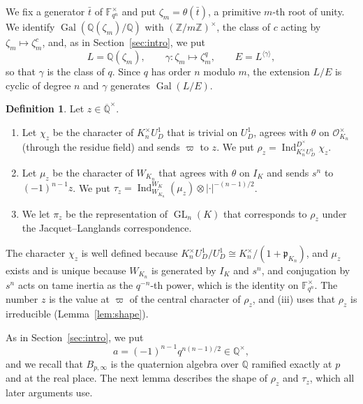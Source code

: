 \documentclass[a4paper,11pt]{amsart}
\theoremstyle{definition}
\newtheorem{definition}[theorem]{Definition}
\theoremstyle{remark}
\numberwithin{equation}{section}
\newcommand{\Q}{\mathbb{Q}}
\newcommand{\Z}{\mathbb{Z}}
\DeclareMathOperator{\Gal}{Gal}
\DeclareMathOperator{\GL}{GL}
\newcommand{\F}{\mathbb{F}}
\newcommand{\Qbar}{\overline{\mathbb{Q}}}
\newcommand{\OO}{\mathcal{O}}
\DeclareMathOperator{\Ind}{Ind}
\begin{document}
We fix a generator $\bar t$ of $\F_{q^n}^\times$ and put $\zeta_m=\theta(\bar t)$, a primitive $m$-th root of unity. We identify $\Gal(\Q(\zeta_m)/\Q)$ with $(\Z/m\Z)^\times$, the class of $c$ acting by $\zeta_m\mapsto\zeta_m^c$, and, as in Section~\ref{sec:intro}, we put
\[
 L=\Q(\zeta_m),\qquad \gamma\colon\zeta_m\mapsto\zeta_m^q,\qquad E=L^{\langle\gamma\rangle},
\]
so that $\gamma$ is the class of $q$. Since $q$ has order $n$ modulo $m$, the extension $L/E$ is cyclic of degree $n$ and $\gamma$ generates $\Gal(L/E)$.

\begin{definition}\label{def:depth-zero-reps}
Let $z\in\Qbar^\times$.
\begin{enumerate}
\item[(i)] Let $\chi_z$ be the character of $K_n^\times U_D^1$ that is trivial on $U_D^1$, agrees with $\theta$ on $\OO_{K_n}^\times$ (through the residue field) and sends $\varpi$ to $z$. We put $\rho_z=\Ind_{K_n^\times U_D^1}^{D^\times}\chi_z$.
\item[(ii)] Let $\mu_z$ be the character of $W_{K_n}$ that agrees with $\theta$ on $I_K$ and sends $s^n$ to $(-1)^{n-1}z$. We put $\tau_z=\Ind_{W_{K_n}}^{W_K}(\mu_z)\otimes|\cdot|^{-(n-1)/2}$.
\item[(iii)] We let $\pi_z$ be the representation of $\GL_n(K)$ that corresponds to $\rho_z$ under the Jacquet--Langlands correspondence.
\end{enumerate}
\end{definition}

The character $\chi_z$ is well defined because $K_n^\times U_D^1/U_D^1\cong K_n^\times/(1+\mathfrak p_{K_n})$, and $\mu_z$ exists and is unique because $W_{K_n}$ is generated by $I_K$ and $s^n$, and conjugation by $s^n$ acts on tame inertia as the $q^{-n}$-th power, which is the identity on $\F_{q^n}^\times$. The number $z$ is the value at $\varpi$ of the central character of $\rho_z$, and (iii) uses that $\rho_z$ is irreducible (Lemma~\ref{lem:shape}).

As in Section~\ref{sec:intro}, we put
\[
 a=(-1)^{n-1}q^{n(n-1)/2}\in\Q^\times,
\]
and we recall that $B_{p,\infty}$ is the quaternion algebra over $\Q$ ramified exactly at $p$ and at the real place. The next lemma describes the shape of $\rho_z$ and $\tau_z$, which all later arguments use.
\end{document}
